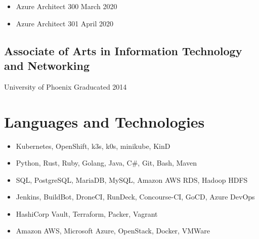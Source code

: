 \documentclass{article}
\begin{document}
      \begin{scriptsize}
      \begin{itemize}

          \item Azure Architect 300 \hfill March 2020

          \item Azure Architect 301 \hfill April 2020

      \end{itemize}
      \end{scriptsize}

    \subsection{Associate of Arts in Information Technology and Networking}
      \begin{scriptsize}
      University of Phoenix
      \hfill
      Graducated 2014
      \end{scriptsize}

  \section{Languages and Technologies}

    \begin{scriptsize}
    \begin{itemize}

      \item Kubernetes, OpenShift, k3s, k0s, minikube, KinD

      \item Python, Rust, Ruby, Golang, Java, C\#, Git, Bash, Maven

      \item SQL, PostgreSQL, MariaDB, MySQL, Amazon AWS RDS, Hadoop HDFS

      \item Jenkins, BuildBot, DroneCI, RunDeck, Concourse-CI, GoCD, Azure
        DevOps

      \item HashiCorp Vault, Terraform, Packer, Vagrant

      \item Amazon AWS, Microsoft Azure, OpenStack, Docker, VMWare

    \end{itemize}
    \end{scriptsize}
\end{document}
